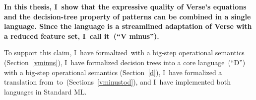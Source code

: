 \documentclass[manuscript,screen 12pt, nonacm]{acmart}
\begin{document}
\bf{In this thesis, I~show} that the expressive quality of Verse's equations and
the decision-tree property of patterns can be combined in a single language.
Since the language is a streamlined adaptation of Verse with a reduced feature
set, I~call it~\VMinus (“V minus”). 

To support this claim, I~have formalized~\VMinus with a big-step operational
semantics (Section~\ref{vminus}), I~have formalized decision trees into a core
language~\D (“D”) with a big-step operational semantics (Section~\ref{d}), 
I~have formalized a translation from~\VMinus to~\D (Sections~\ref{vminustod}),
and I~have implemented both languages in Standard ML. 
\end{document}
